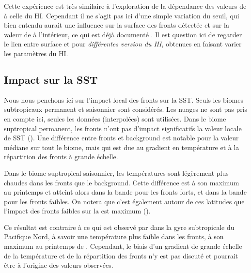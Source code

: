 \begin{note}
  Cette expérience est très similaire à l'exploration de la dépendance des valeurs de  à celle du HI.
  Cependant il ne s'agit pas ici d'une simple variation du seuil, qui bien entendu aurait une influence sur la surface des fronts détectée et sur la valeur de  à l'intérieur, ce qui est déjà documenté .
  Il est question ici de regarder le lien entre surface et  pour \emph{différentes version du HI}, obtenues en faisant varier les paramètres du HI.
\end{note}

\subsection{Impact sur la SST}
\label{sec:res-sst}

Nous nous penchons ici sur l'impact local des fronts sur la SST. Seuls les biomes subtropicaux permanent et saisonnier sont considérés.
Les nuages ne sont pas pris en compte ici, seules les données  (interpolées) sont utilisées.
Dans le biome suptropical permanent, les fronts n'ont pas d'impact significatifs la valeur locale de SST ().
Une différence entre fronts et background est notable pour la valeur médiane sur tout le biome, mais qui est due au gradient en température et à la répartition des fronts à grande échelle.

\begin{figure}
  \centering
  \label{fig:ts-cli-sst}
\end{figure}

Dans le biome suptropical saisonnier, les températures sont légèrement plus chaudes dans les fronts que le background.
Cette différence est à son maximum au printemps et atteint alors  dans la bande  pour les fronts forts, et  dans la bande  pour les fronts faibles.
On notera que c'est également autour de ces latitudes que l'impact des fronts faibles sur la  est maximum ().

Ce résultat est contraire à ce qui est observé par \textcite{liu_2016} dans la gyre subtropicale du Pacifique Nord, à savoir une température plus faible dans les fronts, à son maximum au printemps de .
Cependant, le biais d'un gradient de grande échelle de la température et de la répartition des fronts n'y est pas discuté et pourrait être à l'origine des valeurs observées.
